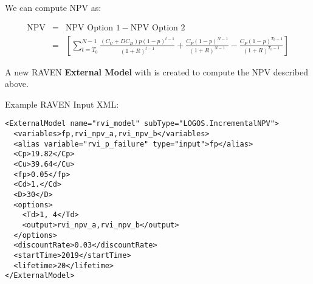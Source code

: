 We can compute  \( \text{NPV} \)  as:\par




\begin{eqnarray}\label{npv_12}
\mbox{NPV}&=&\mbox{NPV Option }1-\mbox{NPV Option }2\\
&=& \left[  \sum _{t=T_{0}}^{N-1}\frac{ \left( C_{U}+DC_{D} \right) p \left( 1-p \right) ^{t-1}}{ \left( 1+R \right) ^{t-1}}+\frac{C_{P} \left( 1-p \right) ^{N-1}}{ \left( 1+R \right) ^{N-1}}-\frac{C_{P} \left( 1-p \right) ^{T_{0}-1}}{ \left( 1+R \right) ^{T_{0}-1}} \right]
\end{eqnarray}

A new RAVEN \textbf{External Model} with  
is created to compute the NPV described above.

Example RAVEN Input  XML:
\begin{lstlisting}[style=XML]
<ExternalModel name="rvi_model" subType="LOGOS.IncrementalNPV">
  <variables>fp,rvi_npv_a,rvi_npv_b</variables>
  <alias variable="rvi_p_failure" type="input">fp</alias>
  <Cp>19.82</Cp>
  <Cu>39.64</Cu>
  <fp>0.05</fp>
  <Cd>1.</Cd>
  <D>30</D>
  <options>
    <Td>1, 4</Td>
    <output>rvi_npv_a,rvi_npv_b</output>
  </options>
  <discountRate>0.03</discountRate>
  <startTime>2019</startTime>
  <lifetime>20</lifetime>
</ExternalModel>
\end{lstlisting}

